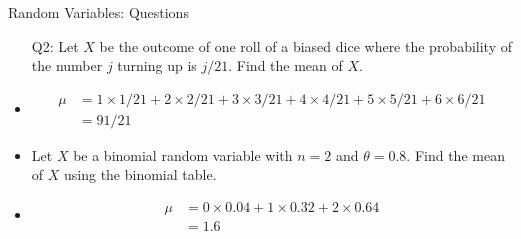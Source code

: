 \documentclass[10pt, xcolor=table]{beamer}
\begin{document}
\begin{frame}{Random Variables: Questions}
\begin{itemize}
\setlength{\itemsep}{6pt}
\item[Q2:] Let $X$ be the outcome of one roll of a biased dice where the probability of the number $j$ turning up is $j/21$. Find the mean of $X$.
\item<2->[A2:] {\color{red} \begin{align*}
\mu &= 1 \times 1/21 + 2 \times 2/21 + 3 \times 3/21 + 4 \times 4/21 + 5 \times 5/21 + 6\times 6/21 \\
&= 91/21
\end{align*}}
\vspace{-0.5cm}
\item<3->[Q3:] Let $X$ be a binomial random variable with $n = 2$ and $\theta = 0.8$. Find the mean of $X$ using the binomial table.
\vspace{0.5cm}
\item<4->[A3:] {\color{red} 
\begin{align*}
\mu &= 0 \times 0.04 + 1 \times 0.32 + 2\times 0.64 \\
&= 1.6
\end{align*}}
\vspace{-0.5cm}
\end{itemize}
\end{frame}
\end{document}
